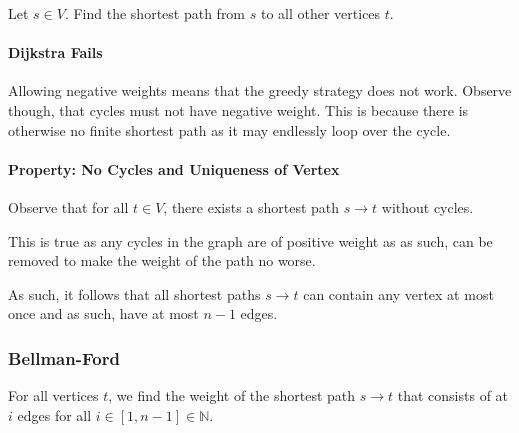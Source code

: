Let \(s \in V\). Find the shortest path from \(s\) to all other vertices  \(t\).

\paragraph{Dijkstra Fails}
Allowing negative weights means that the greedy strategy does not work.
Observe though, that cycles must not have negative weight. This is because
there is otherwise no finite shortest path as it may endlessly loop over the
cycle.

\paragraph{Property: No Cycles and Uniqueness of Vertex}
Observe that for all \(t \in V\), there exists a shortest path \(s \to  t\) without cycles.

This is true as any cycles in the graph are of positive weight as as such, can
be removed to make the weight of the path no worse.

As such, it follows that all shortest paths \(s \to t\) can contain any vertex at most once
and as such, have at most  \(n - 1\) edges.

\subsubsection{Bellman-Ford}
For all vertices \(t\), we find the weight of the shortest path  \(s \to t\)
that consists of at \(i\) edges for all  \(i \in [1, n - 1] \in \mathbb{N}\).




